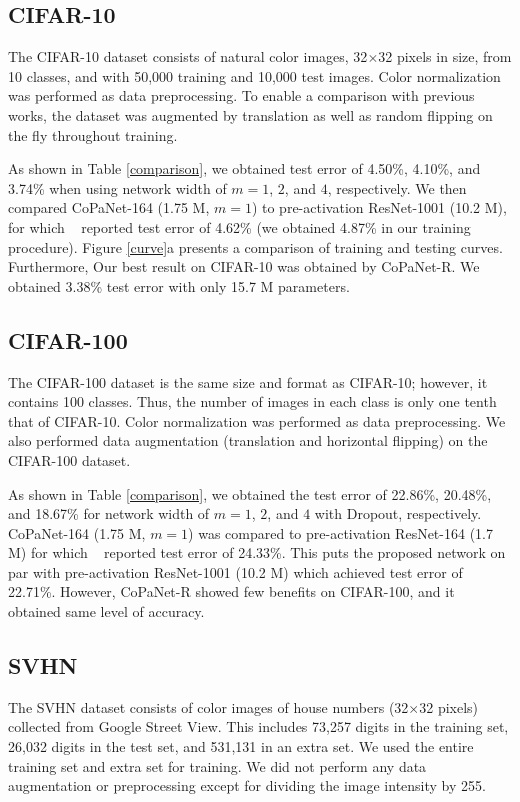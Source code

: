 \documentclass[wcp]{jmlr}
\begin{document}
\subsection{CIFAR-10}
The CIFAR-10 dataset consists of natural color images, 32$\times$32 pixels in size, from 10 classes, and with 50,000 training and 10,000 test images. Color normalization was performed as data preprocessing. To enable a comparison with previous works, the dataset was augmented by translation as well as random flipping on the fly throughout training. 

As shown in Table \ref{comparison}, we obtained test error of 4.50\%, 4.10\%, and 3.74\% when using network width of $m=1$, $2$, and $4$, respectively. 
We then compared CoPaNet-164 (1.75 M, $m=1$) to pre-activation ResNet-1001 (10.2 M), for which ~\cite{he2016identity} reported test error of 4.62\% (we obtained 4.87\% in our training procedure). 
Figure \ref{curve}a presents a comparison of training and testing curves. 
Furthermore, Our best result on CIFAR-10 was obtained by CoPaNet-R.
We obtained 3.38\% test error with only 15.7 M parameters.


\subsection{CIFAR-100}
The CIFAR-100 dataset is the same size and format as CIFAR-10; however, it contains 100 classes. 
Thus, the number of images in each class is only one tenth that of CIFAR-10. Color normalization was performed as data preprocessing. 
We also performed data augmentation (translation and horizontal flipping) on the CIFAR-100 dataset.

As shown in Table \ref{comparison}, we obtained the test error of 22.86\%, 20.48\%, and 18.67\% for network width of $m=1$, $2$, and $4$ with Dropout, respectively.
CoPaNet-164 (1.75 M, $m=1$) was compared to pre-activation ResNet-164 (1.7 M) for which ~\cite{he2016identity} reported test error of 24.33\%. 
This puts the proposed network on par with pre-activation ResNet-1001 (10.2 M) which achieved test error of 22.71\%.
However, CoPaNet-R showed few benefits on CIFAR-100, and it obtained same level of accuracy.

\subsection{SVHN}
The SVHN dataset consists of color images of house numbers (32$\times$32 pixels) collected from Google Street View. 
This includes 73,257 digits in the training set, 26,032 digits in the test set, and 531,131 in an extra set. 
We used the entire training set and extra set for training. 
We did not perform any data augmentation or preprocessing except for dividing the image intensity by 255.
\end{document}
